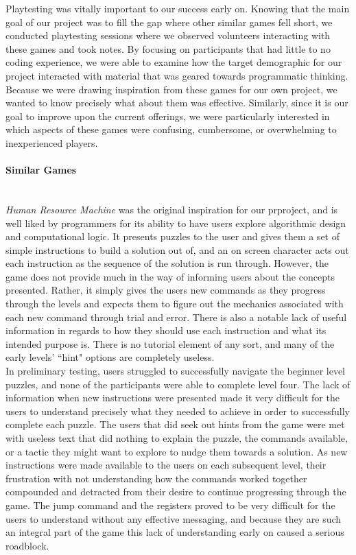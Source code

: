 Playtesting was vitally important to our success early on. Knowing that the main goal of our project was to fill the gap where other similar games fell short, we conducted playtesting sessions where we observed volunteers interacting with these games and took notes. By focusing on participants that had little to no coding experience, we were able to examine how the target demographic for our project interacted with material that was geared towards programmatic thinking. Because we were drawing inspiration from these games for our own project, we wanted to know precisely what about them was effective. Similarly, since it is our goal to improve upon the current offerings, we were particularly interested in which aspects of these games were confusing, cumbersome, or overwhelming to inexperienced players.\\

\paragraph{Similar Games}\mbox{} \\
\textit{Human Resource Machine} was the original inspiration for our prproject, and is well liked by programmers for its ability to have users explore algorithmic design and computational logic. It presents puzzles to the user and gives them a set of simple instructions to build a solution out of, and an on screen character acts out each instruction as the sequence of the solution is run through. However, the game does not provide much in the way of informing users about the concepts presented. Rather, it simply gives the users new commands as they progress through the levels and expects them to figure out the mechanics associated with each new command through trial and error. There is also a notable lack of useful information in regards to how they should use each instruction and what its intended purpose is. There is no tutorial element of any sort, and many of the early levels' ``hint" options are completely useless.\\

In preliminary testing, users struggled to successfully navigate the beginner level puzzles, and none of the participants were able to complete level four. The lack of information when new instructions were presented made it very difficult for the users to understand precisely what they needed to achieve in order to successfully complete each puzzle. The users that did seek out hints from the game were met with useless text that did nothing to explain the puzzle, the commands available, or a tactic they might want to explore to nudge them towards a solution. As new instructions were made available to the users on each subsequent level, their frustration with not understanding how the commands worked together compounded and detracted from their desire to continue progressing through the game. The jump command and the registers proved to be very difficult for the users to understand without any effective messaging, and because they are such an integral part of the game this lack of understanding early on caused a serious roadblock.\\


